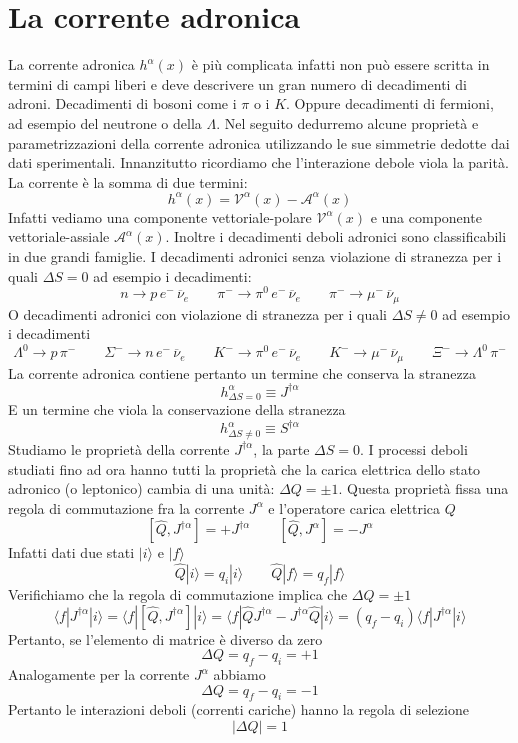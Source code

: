 \section{La corrente adronica}
La corrente adronica $h^\alpha(x)$ è più complicata infatti non può essere scritta in termini di campi liberi e deve descrivere un gran numero di decadimenti di adroni. Decadimenti di bosoni come i $\pi$ o i $K$. Oppure decadimenti di fermioni, ad esempio del neutrone o della $\Lambda$. Nel seguito dedurremo alcune proprietà e parametrizzazioni della corrente adronica utilizzando le sue simmetrie dedotte dai dati sperimentali. Innanzitutto ricordiamo che l'interazione debole viola la parità. La corrente è la somma di due termini:
$$
h^\alpha(x)=\mathcal{V}^\alpha(x)-\mathcal{A}^\alpha(x)
$$
Infatti vediamo una componente vettoriale-polare $\mathcal{V}^\alpha(x)$ e una componente vettoriale-assiale $\mathcal{A}^\alpha(x)$. Inoltre i decadimenti deboli adronici sono classificabili in due grandi famiglie. I decadimenti adronici senza violazione di stranezza per i quali $\Delta S=0$ ad esempio i decadimenti:
$$
n \to p \, e^- \, \overline{\nu}_e \quad \quad \pi^- \to \pi^0 \, e^- \, \overline{\nu}_e \quad \quad \pi^- \to \mu^- \, \overline{\nu}_\mu
$$
O decadimenti adronici con violazione di stranezza per i quali $\Delta S\not=0$ ad esempio i decadimenti
$$
\Lambda^0 \to p \, \pi^- \quad \quad \Sigma^- \to n \, e^- \, \overline{\nu}_e \quad \quad K^- \to \pi^0 \, e^- \, \overline{\nu}_e \quad \quad K^- \to \mu^- \, \overline{\nu}_\mu \quad \quad \Xi^- \to \Lambda^0 \, \pi^-
$$
La corrente adronica contiene pertanto un termine che conserva la stranezza 
$$
h^\alpha_{\Delta S=0} \equiv J^{\dagger \alpha}
$$
E un termine che viola la conservazione della stranezza
$$
h^\alpha_{\Delta S \neq 0} \equiv S^{\dagger \alpha}
$$
Studiamo le proprietà della corrente $J^{\dagger\alpha}$, la parte $\Delta S=0$. I processi deboli studiati fino ad ora hanno tutti la proprietà che la carica elettrica dello stato adronico (o leptonico) cambia di una unità: $\Delta Q=\pm 1$. Questa proprietà fissa una regola di commutazione fra la corrente $J^\alpha$ e l'operatore carica elettrica $Q$
$$
[\widehat{Q}, J^{\dagger \alpha}] = + J^{\dagger \alpha} \quad \quad [\widehat{Q}, J^\alpha] = - J^\alpha
$$
Infatti dati due stati $|i\rangle$ e $|f\rangle$ 
$$
\widehat{Q}|i\rangle = q_i|i\rangle \quad \quad \widehat{Q}|f\rangle = q_f|f\rangle
$$
Verifichiamo che la regola di commutazione implica che $\Delta Q=\pm1$
$$
\langle f | J^{\dagger \alpha} | i \rangle = \langle f | [\widehat{Q}, J^{\dagger \alpha}] | i \rangle = \langle f | \widehat{Q} J^{\dagger \alpha} - J^{\dagger \alpha} \widehat{Q} | i \rangle = (q_f - q_i) \langle f | J^{\dagger \alpha} | i \rangle
$$
Pertanto, se l'elemento di matrice è diverso da zero
$$
\Delta Q = q_f - q_i = +1
$$
Analogamente per la corrente $J^\alpha$ abbiamo
$$
\Delta Q = q_f - q_i = -1
$$
Pertanto le interazioni deboli (correnti cariche) hanno la regola di selezione
$$
|\Delta Q| = 1
$$
